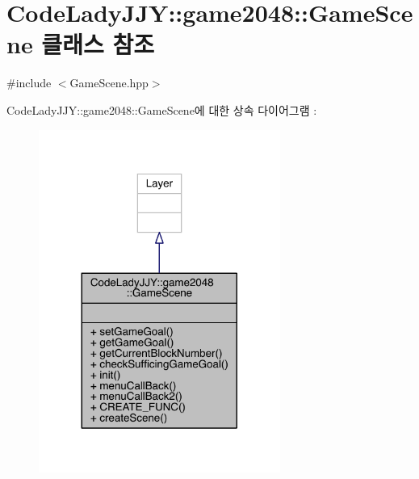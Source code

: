 \hypertarget{class_code_lady_j_j_y_1_1game2048_1_1_game_scene}{}\section{Code\+Lady\+J\+JY\+:\+:game2048\+:\+:Game\+Scene 클래스 참조}
\label{class_code_lady_j_j_y_1_1game2048_1_1_game_scene}


{\ttfamily \#include $<$Game\+Scene.\+hpp$>$}



Code\+Lady\+J\+JY\+:\+:game2048\+:\+:Game\+Scene에 대한 상속 다이어그램 \+: 
\nopagebreak
\begin{figure}[H]
\begin{center}
\leavevmode
\includegraphics[width=224pt]{class_code_lady_j_j_y_1_1game2048_1_1_game_scene__inherit__graph}
\end{center}
\end{figure}


